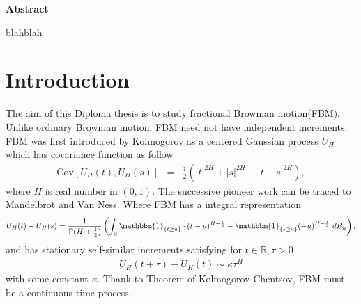 \documentclass[a4paper, twoside, 11pt]{article}
\theoremstyle{definition}
\newcommand{\brkt}[1]{\left({#1} \right)}
\renewenvironment{abstract}{
	\begin{center}
		  \Large
		  \textbf{Abstract}
		  \hspace{2em}
	\end{center}				
  }{}
\begin{document}
  
  \newpage

  \thispagestyle{empty}
  \begin{abstract}
	blahblah
  \end{abstract}
\newpage

\thispagestyle{empty}
\mbox{}
\newpage
\fancyhead[LO, RE]{}
\fancyfoot[LE, RO]{}
\tableofcontents
\newpage
\thispagestyle{empty}
\mbox{}
\newpage

\fancyhead[RO]{\leftmark}
\fancyhead[LE]{\rightmark}
\fancyfoot[LE, RO]{\large \thepage}
\setcounter{section}{0}
\setcounter{page}{1}
\section{Introduction}
The aim of this Diploma thesis is to study fractional Brownian motion(FBM). Unlike ordinary Brownian motion, FBM need not have independent increments. FBM was first introduced by Kolmogorov as a centered Gaussian process $U_H$ which has covariance function as follow
\begin{eqnarray*}
  \mathrm{Cov}[U_H(t), U_H(s)] &=& \frac{1}{2} (|t|^{2H} + |s|^{2H} - |t-s|^{2H}),
\end{eqnarray*}
where $H$ is real number in $(0, 1)$. The successive pioneer work can be traced to Mandelbrot and Van Ness. Where FBM has a integral representation
\begin{eqnarray*}
 	U_H(t) - U_H(s) = \frac{1}{\Gamma(H+\frac{1}{2})}\brkt{\int_{\mathbb{R}} \mathbbm{1}_{\{t\ge u\}}\cdot (t-u)^{H-\frac{1}{2}} - \mathbbm{1}_{\{s\ge u\}} (-u)^{H-\frac{1}{2}} \, \mathop{dB_u}},
	\label{sec:int}
\end{eqnarray*}
and has stationary self-similar increments satisfying for $t\in \mathbb{R}, \tau > 0$
\begin{eqnarray*}
  U_H(t+\tau) - U_H(t) \sim \kappa \tau^{H} 
  \label{sec:int1}
\end{eqnarray*}
with some constant $\kappa$. Thank to Theorem of Kolmogorov Chentsov, FBM must be a continuous-time process.\\
\end{document}
